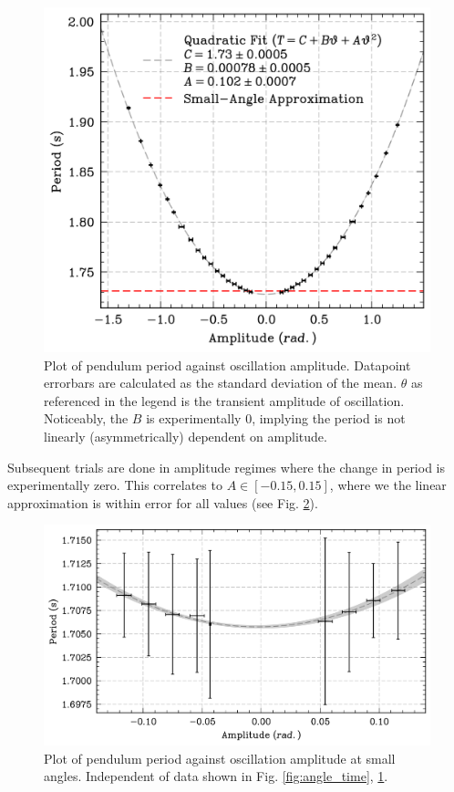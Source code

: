 \documentclass[prl,twocolumn,amsmath,amssymb,superscriptaddress]{revtex4-2}
\begin{document}
\begin{figure}[htb]
    \hspace{-20pt}
    \includegraphics[width=0.85\linewidth]{amp_per_error_of_mean.png}
    \caption{Plot of pendulum period against oscillation amplitude. Datapoint errorbars are calculated as the standard deviation of the mean. $\theta$ as referenced in the legend is the transient amplitude of oscillation. Noticeably, the $B$ is experimentally 0, implying the period is not linearly (asymmetrically) dependent on amplitude.}
    \label{fig:amplitude-period}
\end{figure}

Subsequent trials are done in amplitude regimes where the change in period is experimentally zero. This correlates to $A\in[-0.15,0.15]$, where we the linear approximation is within error for all values (see Fig. \ref{fig:small-angles}).

\begin{figure}[htb]
    \hspace{-20pt}
    \includegraphics[width=0.8\linewidth]{Q-factor-smallangleusage.png}
    \caption{Plot of pendulum period against oscillation amplitude at small angles. Independent of data shown in Fig. \ref{fig:angle_time}, \ref{fig:amplitude-period}.}
    \label{fig:small-angles}
\end{figure}
\end{document}
